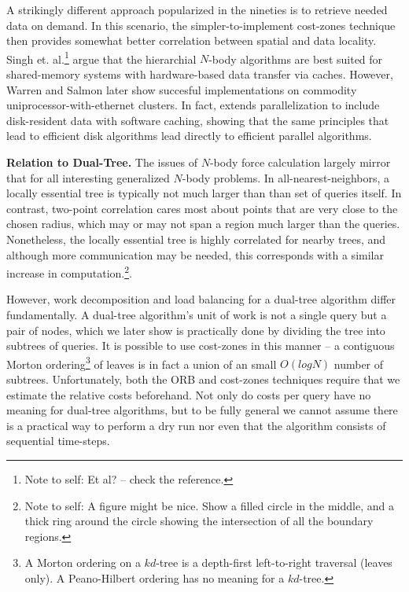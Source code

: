 \documentclass[times, leqno,twocolumn]{article}
\newcommand{\authornote}[1]{\footnote{Note to self: #1}}
\begin{document}
A strikingly different approach popularized in the nineties is to retrieve needed data on demand.
In this scenario, the simpler-to-implement cost-zones technique then provides somewhat better correlation between spatial and data locality.
Singh et. al.\authornote{Et al? -- check the reference.} \cite{singh95load, singh_architecture} argue that the hierarchial $N$-body algorithms are best suited for shared-memory systems with hardware-based data transfer via caches.
However, Warren and Salmon later \cite{warren93,warren97} show succesful implementations on commodity uniprocessor-with-ethernet clusters.
In fact, \cite{warren97} extends parallelization to include disk-resident data with software caching, showing that the same principles that lead to efficient disk algorithms lead directly to efficient parallel algorithms.

{\bf Relation to Dual-Tree.}
The issues of $N$-body force calculation largely mirror that for all interesting generalized $N$-body problems.
In all-nearest-neighbors, a locally essential tree is typically not much larger than than set of queries itself.
In contrast, two-point correlation cares most about points that are very close to the chosen radius, which may or may not span a region much larger than the queries.
Nonetheless, the locally essential tree is highly correlated for nearby trees, and although more communication may be needed, this corresponds with a similar increase in computation.\authornote{A figure might be nice.  Show a filled circle in the middle, and a thick ring around the circle showing the intersection of all the boundary regions.}.

However, work decomposition and load balancing for a dual-tree algorithm differ fundamentally.
A dual-tree algorithm's unit of work is not a single query but a pair of nodes, which we later show is practically done by dividing the tree into subtrees of queries.
It is possible to use cost-zones in this manner -- a contiguous Morton ordering\footnote{A Morton ordering on a $kd$-tree is a depth-first left-to-right traversal (leaves only).  A Peano-Hilbert ordering has no meaning for a $kd$-tree.} of leaves is in fact a union of an small $O(log N)$ number of subtrees.
Unfortunately, both the ORB and cost-zones techniques require that we estimate the relative costs beforehand.
Not only do costs per query have no meaning for dual-tree algorithms, but to be fully general we cannot assume there is a practical way to perform a dry run nor even that the algorithm consists of sequential time-steps.
\end{document}
